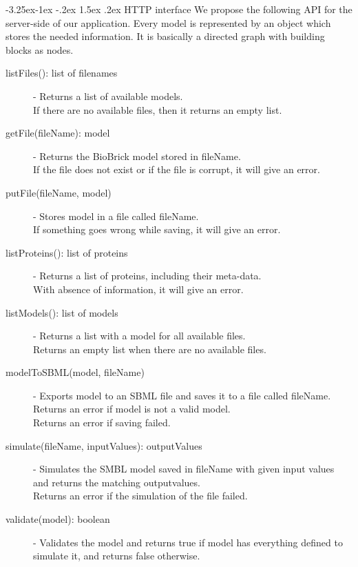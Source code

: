 \documentclass[a4paper]{article}
\makeatletter
\renewcommand\paragraph{\@startsection{paragraph}{4}{\z@}%
  {-3.25ex\@plus -1ex \@minus -.2ex}%
  {1.5ex \@plus .2ex}%
  {\normalfont\normalsize\bfseries}}
\makeatother
\begin{document}
\paragraph{HTTP interface} 
We propose the following API for the server-side of our application. Every model is represented by an object which stores the needed information. It is basically a directed graph with building blocks as nodes. \\
\begin{description}
	\item[listFiles(): list of filenames] -
		Returns a list of available models.\\
		If there are no available files, then it returns an empty list.
	\item[getFile(fileName): model] -
		Returns the BioBrick model stored in fileName.\\
		If the file does not exist or if the file is corrupt, it will give an error.
	\item[putFile(fileName, model)] -
		Stores model in a file called fileName.\\
		If something goes wrong while saving, it will give an error.
	\item[listProteins(): list of proteins] -
		Returns a list of proteins, including their meta-data.\\
		With absence of information, it will give an error.
	\item[listModels(): list of models] -
		Returns a list with a model for all available files.\\
		Returns an empty list when there are no available files.
	\item[modelToSBML(model, fileName)] -
		Exports model to an SBML file and saves it to a file called fileName.\\
		Returns an error if model is not a valid model.\\
		Returns an error if saving failed.
	\item[simulate(fileName, inputValues): outputValues] -
		Simulates the SMBL model saved in fileName with given input values and returns the matching outputvalues.\\
		Returns an error if the simulation of the file failed.
	\item[validate(model): boolean] -
		Validates the model and returns true if model has everything defined to simulate it, and returns false otherwise.\\
\end{description}
\end{document}
